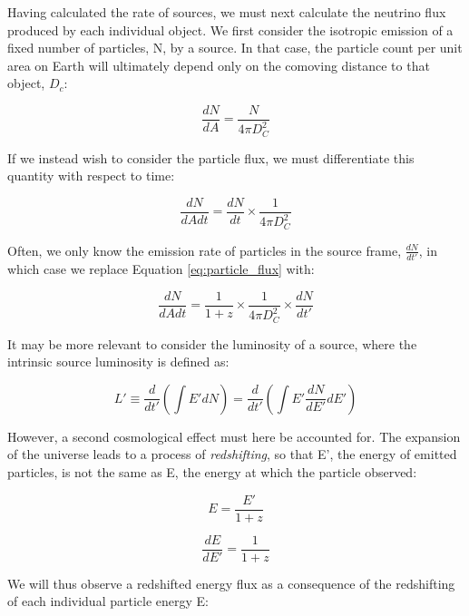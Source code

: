 Having  calculated the rate of sources, we must next calculate the neutrino flux produced by each individual object. We first consider the isotropic emission of a fixed number of particles, N, by a source. In that case, the particle count per unit area on Earth will ultimately depend only on the comoving distance to that object, $D_{c}$:

\begin{equation}
\frac{dN}{dA} = \frac{N}{4 \pi D_{C}^{2}}
\label{eq:particle_per_area}
\end{equation}

If we instead wish to consider the particle flux, we must differentiate this quantity with respect to time:

\begin{equation}
\frac{dN}{dAdt} = \frac{dN}{dt} \times \frac{1}{4 \pi D_{C}^{2}}
\label{eq:particle_flux}
\end{equation}

Often, we only know the emission rate of particles in the source frame, $\frac{dN}{dt'}$, in which case we replace Equation \ref{eq:particle_flux} with:

\begin{equation}
\frac{dN}{dAdt} = \frac{1}{1+z} \times \frac{1}{4 \pi D_{C}^{2}} \times \frac{dN}{dt'}
\label{eq:alt_particle_flux}
\end{equation}

It may be more relevant to consider the luminosity of a source, where the intrinsic source luminosity is defined as:

\begin{equation}
L' \equiv \frac{d}{dt'} \left( \int E' dN \right) = \frac{d}{dt'} \left( \int E' \frac{dN}{dE'} dE' \right)
\end{equation}

However, a second cosmological effect must here be accounted for. The expansion of the universe leads to a process of \emph{redshifting}, so that E', the energy of emitted particles, is not the same as E, the energy at which the particle observed:

\begin{equation}
E = \frac{E'}{1+z}
\label{eq:redshift}
\end{equation}

\begin{equation}
\frac{dE}{dE'} = \frac{1}{1+z}
\label{eq:de}
\end{equation}

We will thus observe a redshifted energy flux as a consequence of the redshifting of each individual particle energy E:


